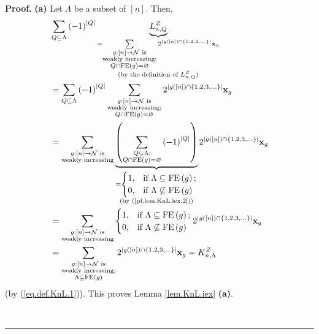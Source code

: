 \documentclass[numbers=enddot,12pt,final,onecolumn,notitlepage]{scrartcl}%
\theoremstyle{definition}
\newenvironment{proof}[1][Proof]{\noindent\textbf{#1.} }{\ \rule{0.5em}{0.5em}}
\newenvironment{verlong}{}{}
\let\sumnonlimits\sum
\renewcommand{\sum}{\sumnonlimits\limits}
\begin{document}
\begin{verlong}
\begin{proof}
\textbf{(a)} Let $\Lambda$ be a subset of $\left[  n\right]  $. Then,%
\begin{align*}
&  \sum_{Q\subseteq\Lambda}\left(  -1\right)  ^{\left\vert Q\right\vert
}\underbrace{L_{n,Q}^{\mathcal{Z}}}_{\substack{=\sum_{\substack{g:\left[
n\right]  \rightarrow\mathcal{N}\text{ is}\\\text{weakly increasing;}%
\\Q\cap\operatorname*{FE}\left(  g\right)  =\varnothing}}2^{\left\vert
g\left(  \left[  n\right]  \right)  \cap\left\{  1,2,3,\ldots\right\}
\right\vert }\mathbf{x}_{g}\\\text{(by the definition of }L_{n,Q}%
^{\mathcal{Z}}\text{)}}}\\
&  =\sum_{Q\subseteq\Lambda}\left(  -1\right)  ^{\left\vert Q\right\vert }%
\sum_{\substack{g:\left[  n\right]  \rightarrow\mathcal{N}\text{
is}\\\text{weakly increasing;}\\Q\cap\operatorname*{FE}\left(  g\right)
=\varnothing}}2^{\left\vert g\left(  \left[  n\right]  \right)  \cap\left\{
1,2,3,\ldots\right\}  \right\vert }\mathbf{x}_{g}\\
&  =\sum_{\substack{g:\left[  n\right]  \rightarrow\mathcal{N}\text{
is}\\\text{weakly increasing}}}\underbrace{\left(  \sum_{\substack{Q\subseteq
\Lambda;\\Q\cap\operatorname*{FE}\left(  g\right)  =\varnothing}}\left(
-1\right)  ^{\left\vert Q\right\vert }\right)  }_{\substack{=%
\begin{cases}
1, & \text{if }\Lambda\subseteq\operatorname*{FE}\left(  g\right)  ;\\
0, & \text{if }\Lambda\not \subseteq \operatorname*{FE}\left(  g\right)
\end{cases}
\\\text{(by (\ref{pf.lem.KnL.iex.2}))}}}2^{\left\vert g\left(  \left[
n\right]  \right)  \cap\left\{  1,2,3,\ldots\right\}  \right\vert }%
\mathbf{x}_{g}\\
&  =\sum_{\substack{g:\left[  n\right]  \rightarrow\mathcal{N}\text{
is}\\\text{weakly increasing}}}%
\begin{cases}
1, & \text{if }\Lambda\subseteq\operatorname*{FE}\left(  g\right)  ;\\
0, & \text{if }\Lambda\not \subseteq \operatorname*{FE}\left(  g\right)
\end{cases}
2^{\left\vert g\left(  \left[  n\right]  \right)  \cap\left\{  1,2,3,\ldots
\right\}  \right\vert }\mathbf{x}_{g}\\
&  =\sum_{\substack{g:\left[  n\right]  \rightarrow\mathcal{N}\text{
is}\\\text{weakly increasing;}\\\Lambda\subseteq\operatorname*{FE}\left(
g\right)  }}2^{\left\vert g\left(  \left[  n\right]  \right)  \cap\left\{
1,2,3,\ldots\right\}  \right\vert }\mathbf{x}_{g}=K_{n,\Lambda}^{\mathcal{Z}}%
\end{align*}
(by (\ref{eq.def.KnL.1})). This proves Lemma \ref{lem.KnL.iex} \textbf{(a)}.


\end{proof}
\end{verlong}
\end{document}
